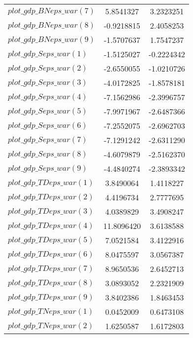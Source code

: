 \begin{center}
\begin{longtable}{lcc}
$plot\_gdp\_BN eps\_war (7)  $	 & 	      5.8541327	 & 	      3.2323251 \\ 
$plot\_gdp\_BN eps\_war (8)  $	 & 	     -0.9218815	 & 	      2.4058253 \\ 
$plot\_gdp\_BN eps\_war (9)  $	 & 	     -1.5707637	 & 	      1.7547237 \\ 
$plot\_gdp\_S eps\_war (1)   $	 & 	     -1.5125027	 & 	     -0.2224342 \\ 
$plot\_gdp\_S eps\_war (2)   $	 & 	     -2.6550055	 & 	     -1.0210726 \\ 
$plot\_gdp\_S eps\_war (3)   $	 & 	     -4.0172825	 & 	     -1.8578181 \\ 
$plot\_gdp\_S eps\_war (4)   $	 & 	     -7.1562986	 & 	     -2.3996757 \\ 
$plot\_gdp\_S eps\_war (5)   $	 & 	     -7.9971967	 & 	     -2.6487366 \\ 
$plot\_gdp\_S eps\_war (6)   $	 & 	     -7.2552075	 & 	     -2.6962703 \\ 
$plot\_gdp\_S eps\_war (7)   $	 & 	     -7.1291242	 & 	     -2.6311290 \\ 
$plot\_gdp\_S eps\_war (8)   $	 & 	     -4.6079879	 & 	     -2.5162370 \\ 
$plot\_gdp\_S eps\_war (9)   $	 & 	     -4.4840274	 & 	     -2.3893342 \\ 
$plot\_gdp\_TD eps\_war (1)  $	 & 	      3.8490064	 & 	      1.4118227 \\ 
$plot\_gdp\_TD eps\_war (2)  $	 & 	      4.4196734	 & 	      2.7777695 \\ 
$plot\_gdp\_TD eps\_war (3)  $	 & 	      4.0389829	 & 	      3.4908247 \\ 
$plot\_gdp\_TD eps\_war (4)  $	 & 	     11.8096420	 & 	      3.6138588 \\ 
$plot\_gdp\_TD eps\_war (5)  $	 & 	      7.0521584	 & 	      3.4122916 \\ 
$plot\_gdp\_TD eps\_war (6)  $	 & 	      8.0475597	 & 	      3.0567387 \\ 
$plot\_gdp\_TD eps\_war (7)  $	 & 	      8.9650536	 & 	      2.6452713 \\ 
$plot\_gdp\_TD eps\_war (8)  $	 & 	      3.0893052	 & 	      2.2321909 \\ 
$plot\_gdp\_TD eps\_war (9)  $	 & 	      3.8402386	 & 	      1.8463453 \\ 
$plot\_gdp\_TN eps\_war (1)  $	 & 	      0.0452009	 & 	      0.6473108 \\ 
$plot\_gdp\_TN eps\_war (2)  $	 & 	      1.6250587	 & 	      1.6172803 \\ 

\end{longtable}
\end{center}
